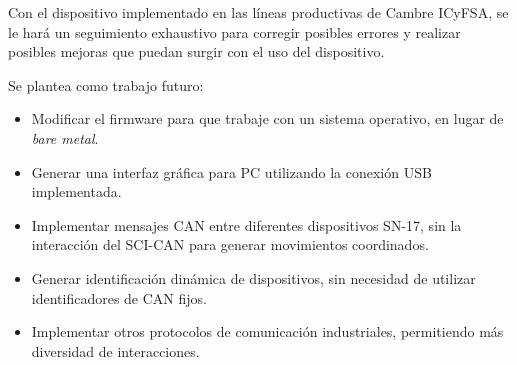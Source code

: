 Con el dispositivo implementado en las líneas productivas de Cambre ICyFSA, se le hará un seguimiento exhaustivo para corregir posibles errores y realizar posibles mejoras que puedan surgir con el uso del dispositivo. 

Se plantea como trabajo futuro:
\begin{itemize}
	\item Modificar el firmware para que trabaje con un sistema operativo, en lugar de \textit{bare metal}.
	\item Generar una interfaz gráfica para PC utilizando la conexión USB implementada.
	\item Implementar mensajes CAN entre diferentes dispositivos SN-17, sin la interacción del SCI-CAN para generar movimientos coordinados.
	\item Generar identificación dinámica de dispositivos, sin necesidad de utilizar identificadores de CAN fijos.
	\item Implementar otros protocolos de comunicación industriales, permitiendo más diversidad de interacciones.
\end{itemize}
